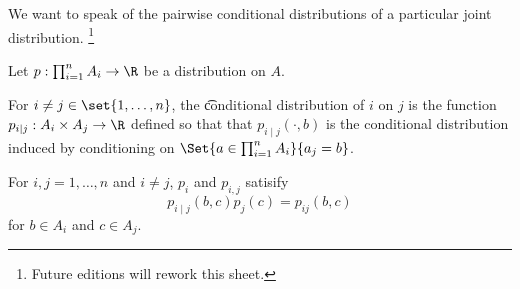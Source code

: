 
We want to speak of the pairwise conditional distributions of a particular joint distribution.
  \ifhmode\unskip\fi\footnote{
Future editions will rework this sheet.
  }

Let $p: \prod_{i = 1}^{n} A_i \to \R $ be a distribution on $A$.

For $i \neq j \in \set{1, \dots , n}$, the \t{conditional distribution} of $i$ on $j$ is the function $p_{i \mid  j}: A_i \times  A_j \to \R $ defined so that that $p_{i \mid  j}(\cdot, b)$ is the conditional distribution induced by conditioning on $\Set{a \in \prod_{i = 1}^{n} A_i }{a_j = b}$.

For $i,j = 1, \dots , n$ and $i \neq j$, $p_i$ and $p_{i,j}$ satisify
  \[
p_{i \mid  j}(b, c)p_{j}(c) = p_{ij}(b, c)
  \]
for $b \in A_i$ and $c \in A_j$.

\blankpage
